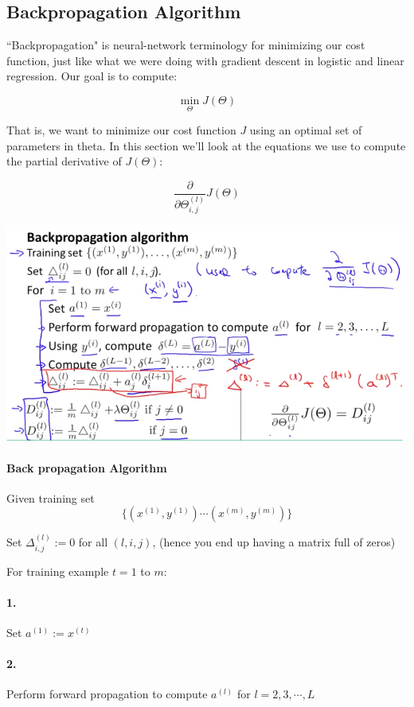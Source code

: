 \documentclass[UTF8]{article}
\begin{document}
\subsection{Backpropagation Algorithm}

``Backpropagation" is neural-network terminology for minimizing our cost function, just like what we were doing with gradient descent in logistic and linear regression. Our goal is to compute:

\[\min_\Theta J(\Theta)\]

That is, we want to minimize our cost function $J$ using an optimal set of parameters in theta. In this section we'll look at the equations we use to compute the partial derivative of $J(\Theta)$:

\[\dfrac{\partial}{\partial \Theta_{i,j}^{(l)}}J(\Theta)\]

\includegraphics[width = \textwidth]{NotePics/9_2_1.png}

\paragraph{Back propagation Algorithm}

Given training set $$\lbrace (x^{(1)}, y^{(1)}) \cdots (x^{(m)}, y^{(m)})\rbrace$$

Set $\Delta^{(l)}_{i,j} := 0$ for all $(l,i,j)$, (hence you end up having a matrix full of zeros)

For training example $t =1$ to $m$:

\paragraph{1.} Set $a^{(1)}:=x^{(t)}$
\paragraph{2.} Perform forward propagation to compute $a^{(l)}$ for $l = 2,3,\cdots,L$
\end{document}
